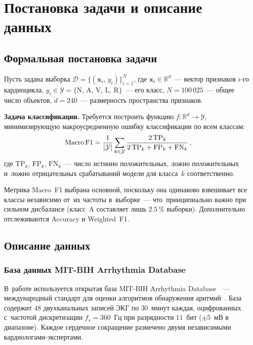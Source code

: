 \section{Постановка задачи и описание данных}
\label{sec:Chapter1}

\subsection{Формальная постановка задачи}

Пусть задана выборка $\mathcal{D} = \{(\mathbf{x}_i,\, y_i)\}_{i=1}^{N}$,
где $\mathbf{x}_i \in \mathbb{R}^d$~--- вектор признаков $i$-го кардиоцикла,
$y_i \in \mathcal{Y} = \{\text{N},\,\text{A},\,\text{V},\,\text{L},\,\text{R}\}$~---
его класс, $N = 100\,025$~--- общее число объектов, $d = 240$~--- размерность
пространства признаков.

\textbf{Задача классификации.}
Требуется построить функцию $f\colon \mathbb{R}^d \to \mathcal{Y}$,
минимизирующую макроусредненную ошибку классификации по всем классам:
\begin{equation}
    \label{eq:macro_f1}
    \text{Macro\,F1} = \frac{1}{|\mathcal{Y}|}\sum_{k \in \mathcal{Y}}
    \frac{2\,\mathrm{TP}_k}{2\,\mathrm{TP}_k + \mathrm{FP}_k + \mathrm{FN}_k}\,,
\end{equation}
где $\mathrm{TP}_k$, $\mathrm{FP}_k$, $\mathrm{FN}_k$~---
число истинно положительных, ложно положительных и~ложно отрицательных
срабатываний модели для класса~$k$ соответственно.

Метрика Macro~F1 выбрана основной, поскольку она одинаково взвешивает все
классы независимо от~их частоты в~выборке~--- что~принципиально важно при
сильном дисбалансе (класс~A составляет лишь $2.5\,\%$ выборки).
Дополнительно отслеживаются Accuracy и Weighted~F1.

\subsection{Описание данных}

\subsubsection{База данных MIT-BIH Arrhythmia Database}

В~работе используется открытая база MIT-BIH Arrhythmia
Database~\cite{moody2001,physionet2000}~--- международный стандарт для
оценки алгоритмов обнаружения аритмий~\cite{aami2012}.
База содержит $48$ двухканальных записей ЭКГ по $30$~минут каждая,
оцифрованных с~частотой дискретизации $f_s = 360$~Гц при разрядности
$11$~бит ($\pm 5$~мВ в диапазоне).
Каждое сердечное сокращение размечено двумя независимыми
кардиологами-экспертами.

